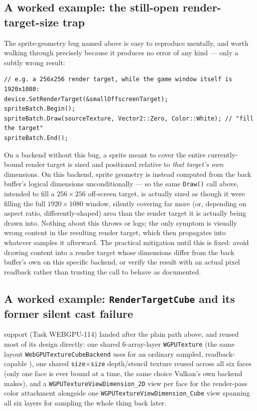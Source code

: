 \subsection{A worked example: the still-open render-target-size trap}

The  sprite-geometry bug named above is easy to reproduce
mentally, and worth walking through precisely because it produces no error of any kind ---
only a subtly wrong result:

\begin{lstlisting}
// e.g. a 256x256 render target, while the game window itself is 1920x1080:
device.SetRenderTarget(&smallOffscreenTarget);
spriteBatch.Begin();
spriteBatch.Draw(sourceTexture, Vector2::Zero, Color::White); // "fill the target"
spriteBatch.End();
\end{lstlisting}

On a backend without this bug, a sprite meant to cover the entire currently-bound render
target is sized and positioned relative to \emph{that target's own} dimensions. On this
backend, sprite geometry is instead computed from the back buffer's logical dimensions
unconditionally --- so the same \texttt{Draw()} call above, intended to fill a
$256\times256$ off-screen target, is actually sized as though it were filling the full
$1920\times1080$ window, silently covering far more (or, depending on aspect ratio,
differently-shaped) area than the render target it is actually being drawn into. Nothing about
this throws or logs; the only symptom is visually wrong content in the resulting render
target, which then propagates into whatever samples it afterward. The practical mitigation
until this is fixed: avoid drawing  content into a render target whose
dimensions differ from the back buffer's own on this specific backend, or verify the result
with an actual pixel readback rather than trusting the call to behave as documented.

\subsection{A worked example: \texttt{RenderTargetCube} and its former silent cast failure}

 support (Task WEBGPU-114) landed after the plain
 path above, and reused most of its design directly: one shared
6-array-layer \texttt{WGPUTexture} (the same layout \texttt{WebGPUTextureCubeBackend} uses
for an ordinary sampled, readback-capable ), one shared
\texttt{size}$\times$\texttt{size}
depth/stencil texture reused across all six faces (only one face is ever bound at a time, the
same choice Vulkan's own  backend makes), and a
\texttt{WGPUTextureViewDimension\_2D} view per face for the render-pass color attachment
alongside one \texttt{WGPUTextureViewDimension\_Cube} view spanning all six layers for sampling
the whole thing back later.

